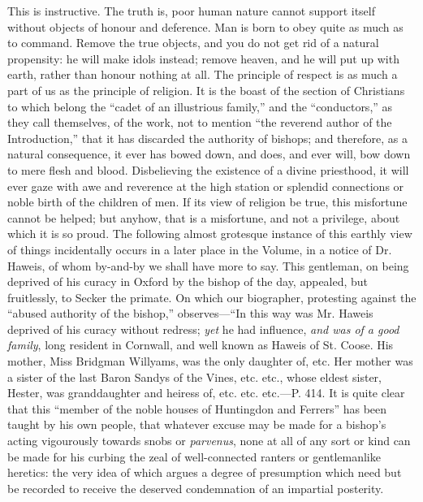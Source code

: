 This is instructive. The truth is, poor human
nature cannot support itself without objects of honour and deference.
Man is born to obey quite as much as to command. Remove the true
objects, and you do not get rid of a natural propensity: he will make
idols instead; remove heaven, and he will put up with earth, rather
than honour nothing at all. The principle of respect is as much a part
of us as the principle of religion. It is the boast of the section of
Christians to which belong the ``cadet of an illustrious family,'' and
the ``conductors,'' as they call themselves, of the work, not to mention
``the reverend author of the Introduction,'' that it has discarded the
authority of bishops; and therefore, as a natural consequence, it ever
has bowed down, and does, and ever will, bow down to mere flesh and
blood. Disbelieving the existence of a divine priesthood, it will ever
gaze with awe and reverence at the high station or splendid
connections or noble birth of the children of men. If its view of
religion be true, this misfortune cannot be helped; but anyhow, that
is a misfortune, and not a privilege, about which it is so proud. The
following almost grotesque instance of this earthly view of things
incidentally occurs in a later place in the Volume, in a notice of Dr.
Haweis, of whom by-and-by we shall have more to say. This
gentleman, on being deprived of his curacy in Oxford by the bishop of
the day, appealed, but fruitlessly, to Secker the primate. On which
our biographer, protesting against the ``abused authority of the
bishop,'' observes—``In this way was Mr. Haweis deprived of his curacy
without redress; \emph{yet} he had influence, \emph{and was of a good
family}, long resident in Cornwall, and well known as Haweis of St.
Coose. His mother, Miss Bridgman Willyams, was the only daughter of,
etc. Her mother was a sister of the last Baron Sandys of the Vines,
etc. etc., whose eldest sister, Hester, was granddaughter and heiress
of, etc. etc. etc.—P. 414. It is quite clear that this ``member of
the noble houses of Huntingdon and Ferrers'' has been taught by his own
people, that whatever excuse may be made for a bishop's acting
vigourously towards snobs or \emph{parvenus}, none at all of any sort
or kind can be made for his curbing the zeal of well-connected ranters
or gentlemanlike heretics: the very idea of which argues a degree of
presumption which need but be recorded to receive the deserved
condemnation of an impartial posterity.

